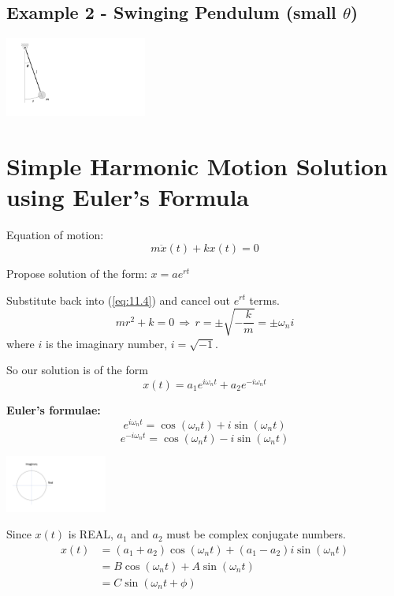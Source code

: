 \documentclass[12pt,letterpaper,twoside]{report}
\begin{document}
\vspace*{10\baselineskip}
\newpage

\subsection{Example 2 - Swinging Pendulum (small $\theta$)}

\includegraphics[trim={2cm 1cm 20cm 1cm},clip,width=0.35\textwidth, left]{Slide78}
\vspace*{10\baselineskip}
\newpage

\section{Simple Harmonic Motion Solution using Euler's Formula}
Equation of motion:
\begin{equation} \label{eq:11.4}
m \ddot{x} (t) + kx(t) = 0
\end{equation}

Propose solution of the form:  $x=ae^{rt}$

Substitute back into (\ref{eq:11.4}) and cancel out $e^{rt}$ terms.
\[
mr^2+k=0 \, \Rightarrow \, r= \pm \sqrt{- \frac{k}{m}} = \pm \omega_n i
\]
where $i$ is the imaginary number, $i = \sqrt{-1}$.

So our solution is of the form
\[
x(t) = a_1 e^{i \omega_n t} + a_2 e^{-i \omega_n t}
\]

\textbf{Euler's formulae:}
\[
e^{i \omega_n t} = \cos ( \omega_n t) + i \sin ( \omega_n t)
\]
\[
e^{-i \omega_n t} = \cos ( \omega_n t) - i \sin ( \omega_n t)
\]

\includegraphics[trim={2cm 3cm 18cm 1cm},clip,width=0.25\textwidth, center]{Slide79}

Since $x(t)$ is REAL, $a_1$ and $a_2$ must be complex conjugate numbers.
\begin{align*}
x(t) &= ( a_1+a_2) \cos (\omega_n t) + (a_1 - a_2) i \sin (\omega_n t)\\
&= B \cos (\omega_n t) + A \sin (\omega_n t)\\
&= C\sin (\omega_n t + \phi)\\
\end{align*}
\end{document}
